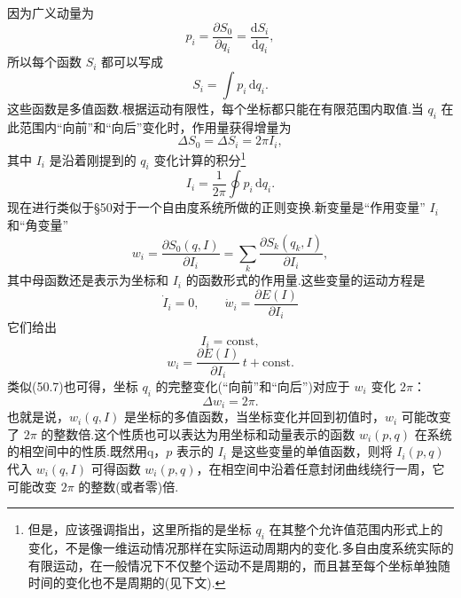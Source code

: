 因为广义动量为
\begin{equation*}
  p_i=\frac{\partial S_0}{\partial q_i}
  =\frac{\mathrm{d}S_i}{\mathrm{d}q_i},
\end{equation*}
所以每个函数 $S_i$ 都可以写成
\begin{equation}
  S_i=\int p_i\,\mathrm{d}q_i.
\end{equation}
这些函数是多值函数.根据运动有限性，每个坐标都只能在有限范围内取值.当 $q_i$
在此范围内“向前”和“向后”变化时，作用量获得增量为
\begin{equation}
  \Delta S_0=\Delta S_i=2\pi I_i,
\end{equation}
其中 $I_i$ 是沿着刚提到的 $q_i$ 变化计算的积分\footnote{但是，应该强调指出，这里所指的是坐标 $q_i$ 在其整个允许值范围内形式上的变化，不是像一维运动情况那样在实际运动周期内的变化.多自由度系统实际的有限运动，在一般情况下不仅整个运动不是周期的，而且甚至每个坐标单独随时间的变化也不是周期的(见下文).}
\begin{equation}
  I_i=\frac{1}{2\pi}\oint p_i\,\mathrm{d}q_i.
\end{equation}
现在进行类似于§50对于一个自由度系统所做的正则变换.新变量是“作用变量” $I_i$
和“角变量”
\begin{equation}
  w_i=\frac{\partial S_0(q,I)}{\partial I_i}
  =\sum_k\frac{\partial S_k(q_k,I)}{\partial I_i},
\end{equation}
其中母函数还是表示为坐标和 $I_i$
的函数形式的作用量.这些变量的运动方程是
\begin{equation*}
  \dot{I}_i=0,\qquad \dot{w}_i=\frac{\partial E(I)}{\partial I_i}
\end{equation*}
它们给出
\begin{equation}
  I_i=\mathrm{const},
\end{equation}
\begin{equation}
  w_i=\frac{\partial E(I)}{\partial I_i}\,t+\mathrm{const.}
\end{equation}
类似(50.7)也可得，坐标 $q_i$
的完整变化(“向前”和“向后”)对应于 $w_i$ 变化 $2\pi$：
\begin{equation}
  \Delta w_i=2\pi.
\end{equation}
也就是说，$w_i(q,I)$
是坐标的多值函数，当坐标变化并回到初值时，$w_i$
可能改变了 $2\pi$
的整数倍.这个性质也可以表达为用坐标和动量表示的函数 $w_i(p,q)$
在系统的相空间中的性质.既然用q，$p$ 表示的 $I_i$
是这些变量的单值函数，则将 $I_i(p,q)$ 代入 $w_i(q,I)$
可得函数 $w_i(p,q)$，在相空间中沿着任意封闭曲线绕行一周，它可能改变
$2\pi$ 的整数(或者零)倍.

